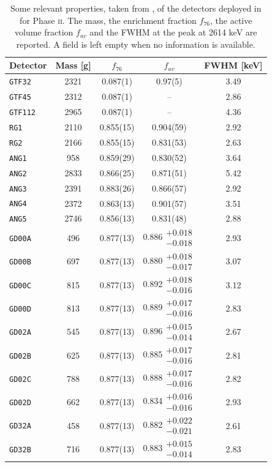 \begin{table}
	\centering
	\caption{Some relevant properties, taken from \cite{GSTR-13-009,GSTR-16-002}, of the detectors deployed in {\gerda} for Phase \textsc{ii}. The mass, the enrichment fraction $f_{76}$, the active volume fraction $f_{av}$ and the FWHM at the  peak at 2614 keV are reported. A field is left empty when no information is available.}\label{tab:gedet1}
		{\renewcommand{\arraystretch}{1.3}
	\begin{tabular}{lcccc}
		\toprule
		Detector		&	Mass [g]	&	$f_{76}$	&	$f_{av}$	&	FWHM [keV] \\
		\midrule
		\texttt{GTF32}	&	2321	&	0.087(1)	&	0.97(5)		&	3.49	\\
		\texttt{GTF45}	&	2312	&	0.087(1)	&	--			&	2.86	\\
		\texttt{GTF112}	&	2965	&	0.087(1)	&	--			&	4.36	\\
		\texttt{RG1}	&	2110	&	0.855(15)	&	0.904(59)	&	2.92	\\
		\texttt{RG2}	&	2166	&	0.855(15)	&	0.831(53)	&	2.63	\\
		\texttt{ANG1}	&	958 	&	0.859(29)	&	0.830(52)	&	3.64	\\
		\texttt{ANG2}	&	2833	&	0.866(25)	&	0.871(51)	&	5.42	\\
		\texttt{ANG3}	&	2391	&	0.883(26)	&	0.866(57)	&	2.92	\\
		\texttt{ANG4}	&	2372	&	0.863(13)	&	0.901(57)	&	3.51	\\
		\texttt{ANG5}	&	2746	&	0.856(13)	&	0.831(48)	&	2.88	\\
		\texttt{GD00A}	&	496 	&	0.877(13)	&	0.886$\substack{+0.018\\-0.018}$	&	2.93	\\
		\texttt{GD00B}	&	697 	&	0.877(13)	&	0.880$\substack{+0.018\\-0.017}$	&	3.07	\\
		\texttt{GD00C}	&	815 	&	0.877(13)	&	0.892$\substack{+0.018\\-0.016}$	&	3.12	\\
		\texttt{GD00D}	&	813 	&	0.877(13)	&	0.889$\substack{+0.017\\-0.016}$	&	2.83	\\
		\texttt{GD02A}	&	545 	&	0.877(13)	&	0.896$\substack{+0.015\\-0.014}$	&	2.67	\\
		\texttt{GD02B}	&	625 	&	0.877(13)	&	0.885$\substack{+0.017\\-0.016}$	&	2.81	\\
		\texttt{GD02C}	&	788 	&	0.877(13)	&	0.888$\substack{+0.017\\-0.016}$	&	2.82	\\
		\texttt{GD02D}	&	662 	&	0.877(13)	&	0.834$\substack{+0.016\\-0.016}$	&	2.93	\\
		\texttt{GD32A}	&	458 	&	0.877(13)	&	0.882$\substack{+0.022\\-0.021}$	&	2.61	\\
		\texttt{GD32B}	&	716 	&	0.877(13)	&	0.883$\substack{+0.015\\-0.014}$	&	2.83	\\
		\bottomrule
	\end{tabular}
}
\end{table}
